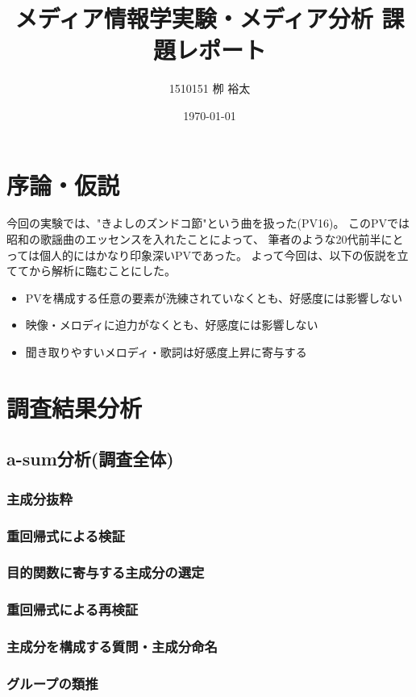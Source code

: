 \documentclass[11pt,a4paper, uplatex]{jsarticle}
\title{メディア情報学実験・メディア分析 課題レポート}
\author{1510151  栁 裕太}
\date{\today}
\begin{document}
\maketitle
\section{序論・仮説}
今回の実験では、"きよしのズンドコ節"という曲を扱った(PV16)。
このPVでは昭和の歌謡曲のエッセンスを入れたことによって、
筆者のような20代前半にとっては個人的にはかなり印象深いPVであった。
よって今回は、以下の仮説を立ててから解析に臨むことにした。

\begin{itemize}
  \item PVを構成する任意の要素が洗練されていなくとも、好感度には影響しない
  \item 映像・メロディに迫力がなくとも、好感度には影響しない
  \item 聞き取りやすいメロディ・歌詞は好感度上昇に寄与する
\end{itemize}

\section{調査結果分析}
\subsection{a-sum分析(調査全体)}
\subsubsection{主成分抜粋}
\subsubsection{重回帰式による検証}
\subsubsection{目的関数に寄与する主成分の選定}
\subsubsection{重回帰式による再検証}
\subsubsection{主成分を構成する質問・主成分命名}
\subsubsection{グループの類推}
\end{document}
